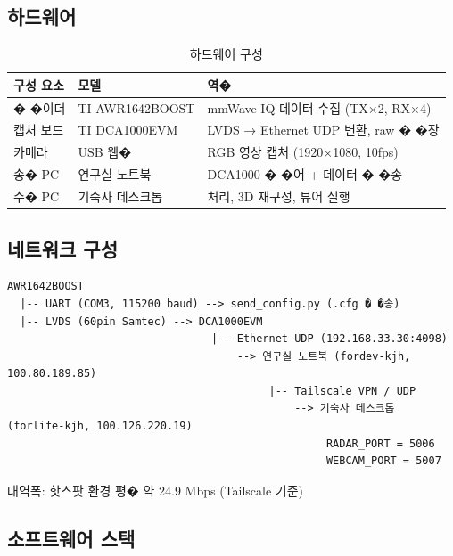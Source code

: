 \documentclass[a4paper,12pt]{article}
\begin{document}
\subsection{하드웨어}

\begin{table}[h]
\centering
\begin{tabularx}{\textwidth}{llX}
  \toprule
  \textbf{구성 요소} & \textbf{모델} & \textbf{역� } \\
  \midrule
  � �이더 & TI AWR1642BOOST & mmWave IQ 데이터 수집 (TX×2, RX×4) \\
  캡처 보드 & TI DCA1000EVM & LVDS → Ethernet UDP 변환, raw � �장 \\
  카메라 & USB 웹�  & RGB 영상 캡처 (1920×1080, 10fps) \\
  송�  PC & 연구실 노트북 & DCA1000 � �어 + 데이터 � �송 \\
  수�  PC & 기숙사 데스크톱 & 처리, 3D 재구성, 뷰어 실행 \\
  \bottomrule
\end{tabularx}
\caption{하드웨어 구성}
\end{table}

\subsection{네트워크 구성}

\begin{lstlisting}[style=plain]
AWR1642BOOST
  |-- UART (COM3, 115200 baud) --> send_config.py (.cfg � �송)
  |-- LVDS (60pin Samtec) --> DCA1000EVM
                                |-- Ethernet UDP (192.168.33.30:4098)
                                    --> 연구실 노트북 (fordev-kjh, 100.80.189.85)
                                         |-- Tailscale VPN / UDP
                                             --> 기숙사 데스크톱 (forlife-kjh, 100.126.220.19)
                                                  RADAR_PORT = 5006
                                                  WEBCAM_PORT = 5007
\end{lstlisting}

\noindent 대역폭: 핫스팟 환경 평�  약 24.9 Mbps (Tailscale 기준)

\subsection{소프트웨어 스택}
\end{document}
